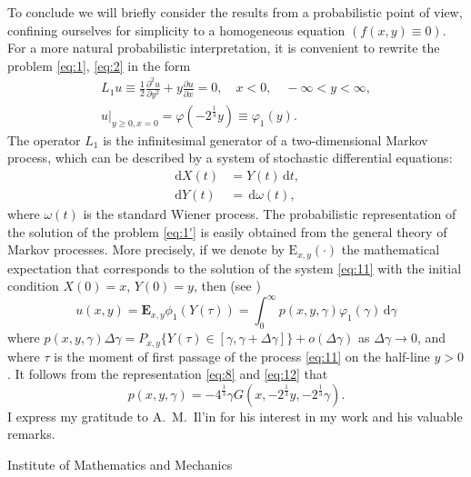 \documentclass[a4paper,12pt]{article}
\newcommand{\dd}{\,\mathrm{d}}
\begin{document}
To conclude we will briefly consider the results from a probabilistic point of view, confining ourselves for simplicity to a homogeneous equation $(f(x, y) \equiv 0)$. For a more natural probabilistic interpretation, it is convenient to rewrite the problem \eqref{eq:1},
\eqref{eq:2} in the form
\begin{equation}
	\label{eq:1'}
	\tag{$1^\prime$}
	\begin{split}
		L_{1} u \equiv \frac{1}{2} \frac{\partial^{2} u}{\partial y^{2}}+y \frac{\partial u}{\partial x}=0, \quad x<0, \quad-\infty<y<\infty, \\
		\left.u\right|_{y \geqslant 0, x=0}=\varphi\left(-2^{\frac{1}{3}} y\right) \equiv \varphi_{1}(y) .
	\end{split}
\end{equation}
The operator $L_{1}$ is the infinitesimal generator of a two-dimensional Markov process, which can be described by a system of stochastic differential equations:
\begin{equation} \label{eq:11}
	\begin{split}
		\dd X(t) & = Y(t) \dd t, \\
		\dd Y(t) & =\dd\omega(t),
	\end{split}
\end{equation}
where $\omega(t)$ is the standard Wiener process. The probabilistic representation of the solution of the problem \eqref{eq:1'} is easily obtained from the general theory of Markov processes. More precisely, if we denote by $\mathrm{E}_{x, y}(\cdot)$ the mathematical expectation that corresponds to the solution of the system \eqref{eq:11} with the initial condition $X(0)=x$, $Y(0)=y$, then (see \cite{zbMATH03215021})
\begin{equation} \label{eq:12}
u(x, y)=\mathbf{E}_{x, y} \phi_{1}(Y(\tau))=\int_{0}^{\infty} p(x, y, \gamma) \varphi_{1}(\gamma) \dd \gamma
\end{equation}
where $p(x, y, \gamma) \Delta \gamma =P_{x, y}\{Y(\tau) \in[\gamma, \gamma+\Delta \gamma]\}+o(\Delta \gamma)$ as $\Delta \gamma \rightarrow 0$, and where $\tau$ is the moment of first passage of the process \eqref{eq:11} on the half-line $y>0$. It follows from the representation \eqref{eq:8} and \eqref{eq:12} that
$$
p(x, y, \gamma)=-4^{\frac{1}{3}} \gamma G\left(x,-2^{\frac{1}{3}} y,-2^{\frac{1}{3}} \gamma\right) .
$$
I express my gratitude to A.\ M.\ Il'in for his interest in my work and his valuable remarks.

\bigskip

Institute of Mathematics and Mechanics
\end{document}

